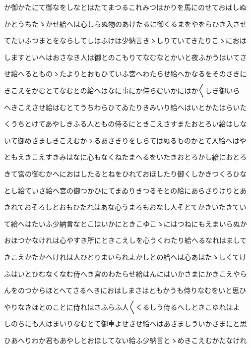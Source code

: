 \documentclass[a4paper,11pt,landscape]{ltjtarticle}
\begin{document}
か御かたにて御なをしなとはたてまつるこれみつはかりを馬にのせておはしぬ
\par\medskip
かとうちたゝかせ給へは心しらぬ物のあけたるに御くるまをやをらひき入させ
\par\medskip
てたいふつまとをならしてしはふけは少納言きゝしりていてきたりこゝにおは
\par\medskip
しますといへはおさなき人は御とのこもりてなむなとかいと夜ふかうはいてさ
\par\medskip
せ給へるとものゝたよりとおもひていふ宮へわたらせ給へかなるをそのさきに
\par\medskip
きこえをかむとてなむとの給へはなに事にか侍らむいかにはか〱しき御いら
\par\medskip
へきこえさせ給はむとてうちわらひてゐたりきみいり給へはいとかたはらいた
\par\medskip
くうちとけてあやしきふる人ともの侍るにときこえさすまたおとろい給はしな
\par\medskip
いて御めさましきこえむかゝるあさきりをしらてはぬるものかとて入給へはや
\par\medskip
ともえきこえすきみはなに心もなくねたまへるをいたきおとろかし給におとろ
\par\medskip
きて宮の御むかへにおはしたるとねをひれておほしたり御くしかきつくろひな
\par\medskip
とし給ていさ給へ宮の御つかひにてまゐりきつるそとの給にあらさりけりとあ
\par\medskip
きれておそろしとおもひたれはあな心うまろもおなし人そとてかきいたきてい
\par\medskip
て給へはたいふ少納言なとこはいかにときこゆこゝにはつねにもえまいらぬか
\par\medskip
おほつかなけれは心やすき所にときこえしを心うくわたり給へるなれはまして
\par\medskip
きこえかたかへけれは人ひとりまいられよかしとの給へは心あはたゝしくてけ
\par\medskip
ふはいとひむなくなむ侍へき宮のわたらせ給はんにはいかさまにかきこえやら
\par\medskip
んをのつからほとへてさるへきにおはしまさはともかうも侍りなむをいと思ひ
\par\medskip
やりなきほとのことに侍れはさふらふ人〱くるしう侍るへしときこゆれはよ
\par\medskip
しのちにも人はまいりなむとて御車よせさせ給へはあさましういかさまにと思
\par\medskip
ひあへりわか君もあやしとおほしてない給ふ少納言とゝめきこえむかたなけれ
\par\medskip
\end{document}
